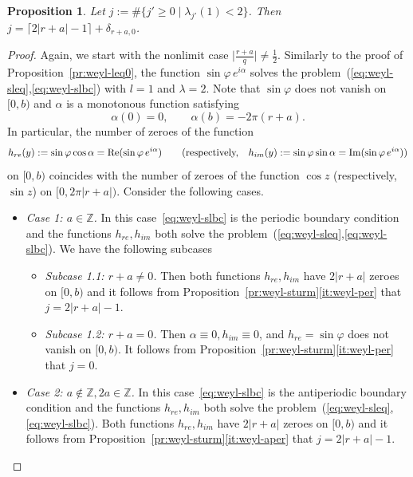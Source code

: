 \documentclass{amsart}
\let\ge\geqslant
\let\phi\varphi
\renewcommand{\Im}{\mathop{\mathrm{Im}}\nolimits}
\renewcommand{\Re}{\mathop{\mathrm{Re}}\nolimits}
\theoremstyle{plain}
\newtheorem{proposition}{Proposition}[section]
\theoremstyle{definition}
\theoremstyle{remark}
\begin{document}
\begin{proposition}\label{pr:weyl-leq1}
Let \(j:=\#\{j'\ge 0\mid\lambda_{j'}(1)<2\}\). Then \(j=\lceil
2|r+a|-1\rceil+\delta_{r+a,0}\).
\end{proposition}

\begin{proof}
Again, we start with the nonlimit case \(\bigl|\frac{r+a}q\bigr|\ne\frac{1}2\).
Similarly to the proof of Proposition~\ref{pr:weyl-leq0}, the function
\(\sin\phi\,e^{i\alpha}\) solves the
problem~(\ref{eq:weyl-sleq},\ref{eq:weyl-slbc}) with \(l=1\) and \(\lambda=2\).
Note that \(\sin\phi\) does not vanish on \([0,b)\) and \(\alpha\) is a
monotonous function satisfying
\[
\alpha(0)=0,\qquad\alpha(b)=-2\pi(r+a).
\]
In particular, the number of zeroes of the function
\[
h_{re}(y):=\sin\phi\cos\alpha=\Re(\sin\phi\,e^{i\alpha})\qquad
\text{(respectively,\quad
\(h_{im}(y):=\sin\phi\sin\alpha=\Im(\sin\phi\,e^{i\alpha})\))}
\]
on \([0,b)\) coincides with the number of zeroes of the function \(\cos z\)
(respectively, \(\sin z\)) on \([0,2\pi|r+a|)\). Consider the following cases.

\begin{itemize}
\item\emph{Case 1: \(a\in\mathbb Z\).} In this case~\eqref{eq:weyl-slbc} is the
periodic boundary condition and the functions \(h_{re},h_{im}\) both solve the
problem~(\ref{eq:weyl-sleq},\ref{eq:weyl-slbc}). We have the following subcases

\begin{itemize}
\item\emph{Subcase 1.1: \(r+a\ne 0\).} Then both functions \(h_{re},h_{im}\)
have \(2|r+a|\) zeroes on \([0,b)\) and it follows from
Proposition~\ref{pr:weyl-sturm}\ref{it:weyl-per} that \(j=2|r+a|-1\).

\item\emph{Subcase 1.2: \(r+a=0\).} Then \(\alpha\equiv 0,h_{im}\equiv 0\), and
\(h_{re}=\sin\phi\) does not vanish on \([0,b)\). It follows from
Proposition~\ref{pr:weyl-sturm}\ref{it:weyl-per} that \(j=0\).
\end{itemize}

\item\emph{Case 2: \(a\notin\mathbb Z,2a\in\mathbb Z\).} In this
case~\eqref{eq:weyl-slbc} is the antiperiodic boundary condition and the
functions \(h_{re},h_{im}\) both solve the
problem~(\ref{eq:weyl-sleq},\ref{eq:weyl-slbc}). Both functions
\(h_{re},h_{im}\) have \(2|r+a|\) zeroes on \([0,b)\) and it follows from
Proposition~\ref{pr:weyl-sturm}\ref{it:weyl-aper} that \(j=2|r+a|-1\).


\end{itemize}
\end{proof}
\end{document}
